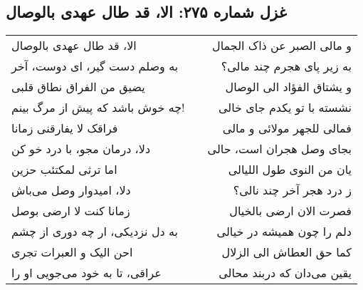 \begin{center}
\section*{غزل شماره ۲۷۵: الا، قد طال عهدی بالوصال}
\label{sec:275}
\begin{longtable}{l p{0.5cm} r}
الا، قد طال عهدی بالوصال
&&
و مالی الصبر عن ذاک الجمال
\\
به وصلم دست گیر، ای دوست، آخر
&&
به زیر پای هجرم چند مالی؟
\\
یضیق من الفراق نطاق قلبی
&&
و یشتاق الفؤاد الی الوصال
\\
چه خوش باشد که پیش از مرگ بینم!
&&
نشسته با تو یکدم جای خالی
\\
فراقک لا یفارقنی زمانا
&&
فمالی للجهر مولائی و مالی
\\
دلا، درمان مجو، با درد خو کن
&&
بجای وصل هجران است، حالی
\\
اما ترثی لمکتئب حزین
&&
یان من النوی طول اللیالی
\\
دلا، امیدوار وصل می‌باش
&&
ز درد هجر آخر چند نالی؟
\\
زمانا کنت لا ارضی بوصل
&&
فصرت الان ارضی بالخیال
\\
به دل نزدیکی، ار چه دوری از چشم
&&
دلم را چون همیشه در خیالی
\\
احن الیک و العبرات تجری
&&
کما حق العطاش الی الزلال
\\
عراقی، تا به خود می‌جویی او را
&&
یقین می‌دان که دربند محالی
\\
\end{longtable}
\end{center}
